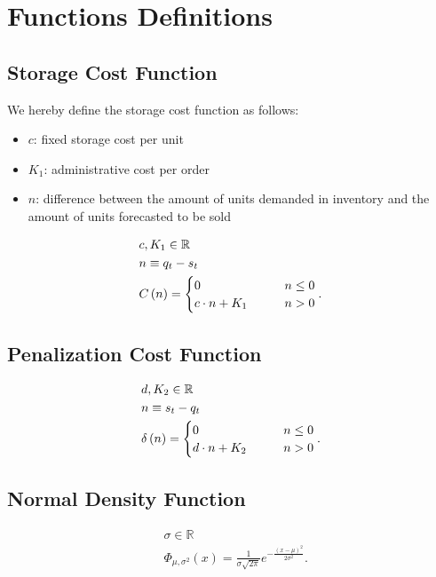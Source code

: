 \documentclass{OptiFlow}
\begin{document}
\section{Functions Definitions}
\subsection{Storage Cost Function}
We hereby define the storage cost function as follows:
\begin{itemize}
	\item $c$: fixed storage cost per unit
	\item $K_1$: administrative cost per order
	\item $n$: difference between the amount of units demanded in inventory and the amount of units forecasted to be sold
\end{itemize}

\begin{align*}
	&c, K_1 \in \mathbb{R}\\
	&n \equiv q_t - s_t\\
	&C\left( n \right) =  \begin{cases}
		0 \text{\qquad} &n \le  0\\
		c\cdot n +K_1 \text{\qquad} &n>0
	\end{cases}  
.\end{align*}

\subsection{Penalization Cost Function}
\begin{align*}
	&d,K_2 \in  \mathbb{R}\\
	&n \equiv s_t - q_t\\
	&\delta\left( n \right) = \begin{cases}
		0 \text{\qquad} &n \le  0\\
		d\cdot n + K_2 \text{\qquad} &n > 0
	\end{cases}
.\end{align*}

\subsection{Normal Density Function}
\begin{align*}
	&\sigma \in \mathbb{R}\\
	&\Phi_{\mu, \sigma^2}\left( x \right)   = \frac{1}{\sigma \sqrt{2\pi} }e^{- \frac{\left( x-\mu \right) ^2}{2 \sigma^2}}
.\end{align*}
\end{document}

